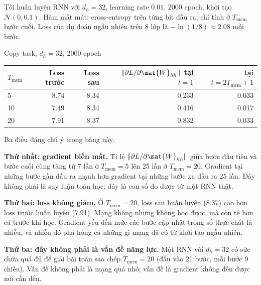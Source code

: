Tôi huấn luyện RNN với $d_h = 32$, learning rate $0.01$, 2000 epoch, khởi tạo
$\mathcal{N}(0, 0.1)$. Hàm mất mát: cross-entropy trên từng bit đầu ra, chỉ
tính ở $T_{\text{mem}}$ bước cuối. Loss của dự đoán ngẫu nhiên trên 8 lớp là
$-\ln(1/8) \approx 2.08$ mỗi bước.

\begin{measured}{Copy task, $d_h = 32$, 2000 epoch}
\small
\begin{tabular}{@{}lrrrr@{}}
\toprule
$T_{\text{mem}}$ & Loss trước & Loss sau &
$\|\partial L / \partial \mat{W}_{hh}\|$ tại $t=1$ & tại $t=2T_{\text{mem}}+1$ \\
\midrule
5  & 8.74 & 8.34 & 0.233 & 0.033 \\
10 & 7.49 & 8.34 & 0.416 & 0.017 \\
20 & 7.91 & 8.37 & 0.832 & 0.033 \\
\bottomrule
\end{tabular}
\normalsize
\end{measured}

Ba điều đáng chú ý trong bảng này.

\textbf{Thứ nhất: gradient biến mất.} Tỉ lệ $\|\partial L / \partial
\mat{W}_{hh}\|$ giữa bước đầu tiên và bước cuối cùng tăng từ 7 lần ở
$T_{\text{mem}} = 5$ lên 25 lần ở $T_{\text{mem}} = 20$. Gradient tại những
bước gần đầu ra mạnh hơn gradient tại những bước xa đầu ra 25 lần. Đây không
phải là suy luận toán học; đây là con số đo được từ một RNN thật.

\textbf{Thứ hai: loss không giảm.} Ở $T_{\text{mem}} = 20$, loss sau huấn
luyện (8.37) cao hơn loss trước huấn luyện (7.91). Mạng không những không
học được, mà còn tệ hơn cả trước khi học. Gradient yếu đến mức các bước cập
nhật trọng số thực chất là nhiễu, và nhiễu đó phá hỏng cả những gì mạng đã
có từ khởi tạo ngẫu nhiên.

\textbf{Thứ ba: đây không phải là vấn đề năng lực.} Một RNN với $d_h = 32$
có sức chứa quá đủ để giải bài toán sao chép $T_{\text{mem}} = 20$ (đầu vào
21 bước, mỗi bước 9 chiều). Vấn đề không phải là mạng quá nhỏ; vấn đề là
gradient không đến được nơi cần đến.

%
